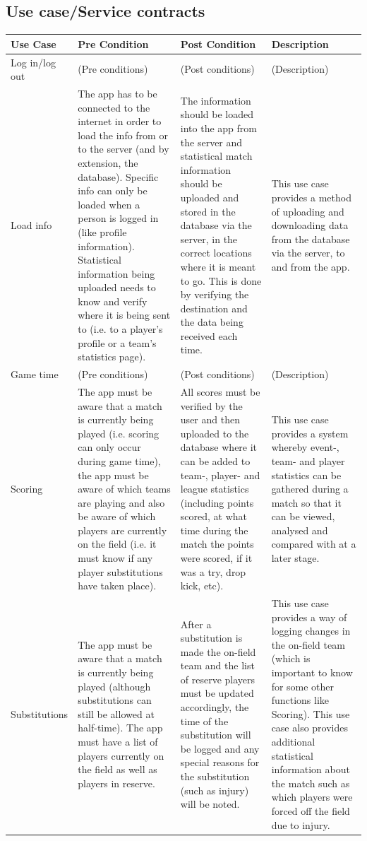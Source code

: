 \documentclass[a4paper,12pt]{report}
\begin{document}
\subsection{Use case/Service contracts}
\begin{center}
  \begin{longtable}{| p{3cm} | p{4cm} | p{4cm} | p{4cm} |}
    \hline
    Use Case & Pre Condition & Post Condition & Description \\ 
    \hline \hline
    Log in/log out & (Pre conditions) & (Post conditions) & (Description)\\ 
    \hline
    Load info & The app has to be connected to the internet in order to load the info from or to the server (and by extension, the database). Specific info can only be loaded when a person is logged in (like profile information). Statistical information being uploaded needs to know and verify where it is being sent to (i.e. to a player's profile or a team's statistics page). & The information should be loaded into the app from the server and statistical match information should be uploaded and stored in the database via the server, in the correct locations where it is meant to go. This is done by verifying the destination and the data being received each time. & This use case provides a method of uploading and downloading data from the database via the server, to and from the app. \\ 
    \hline
    Game time & (Pre conditions) & (Post conditions)  & (Description) \\ 
    \hline
    Scoring & The app must be aware that a match is currently being played (i.e. scoring can only occur during game time), the app must be aware of which teams are playing and also be aware of which players are currently on the field (i.e. it must know if any player substitutions have taken place). & All scores must be verified by the user and then uploaded to the database where it can be added to team-, player- and league statistics (including points scored, at what time during the match the points were scored, if it was a try, drop kick, etc). & This use case provides a system whereby event-, team- and player statistics can be gathered during a match so that it can be viewed, analysed and compared with at a later stage.\\ \hline
    Substitutions & The app must be aware that a match is currently being played (although substitutions can still be allowed at half-time). The app must have a list of players currently on the field as well as players in reserve. & After a substitution is made the on-field team and the list of reserve players must be updated accordingly, the time of the substitution will be logged and any special reasons for the substitution (such as injury) will be noted. & This use case provides a way of logging changes in the on-field team (which is important to know for some other functions like Scoring). This use case also provides additional statistical information about the match such as which players were forced off the field due to injury.\\ \hline

\end{longtable}
\end{center}
\end{document}
